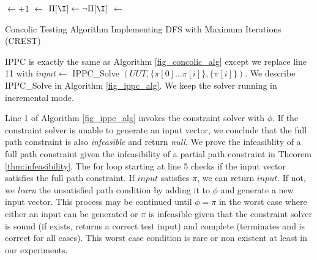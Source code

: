 \documentclass[EPiCempty]{easychair}
\begin{document}
\begin{algorithm}[!t]
\BlankLine
	\If{\NITR $<$ \MaxItr}
		{\label{Line4}
			\If{\TestInput $\neq$ \Null}
				{
					\NITR$\leftarrow$\NITR$+1$\;
					\Pi$\leftarrow$\Execute{\UUT, \TestInput}\;
					\Add{\Out, \TestInput}\;
				}
			\For{\I$\leftarrow $\SizeOf{\Pi}$-1$ \KwTo $0$}
				{
					\If{$!$\IsNegatedBefore{$\Pi[\I]$}}
						{
							\SetNegatedBefore{$\Pi[\I]$}\;
							$\Pi[\I] \leftarrow \neg \Pi[\I]$\;
							\TestInput$\leftarrow$ \CS{$\lbrace \Pi[0]...\Pi[i] \rbrace$}\;
							\KwReturn \DFS{\UUT, \MaxItr, \TestInput, \Out, \NITR}\;
						}
				}
		}
\KwReturn \Out\;

\caption{Concolic Testing Algorithm Implementing DFS with Maximum Iterations (CREST)} \label{fig_concolic_alg}
\end{algorithm}

IPPC is exactly the same as Algorithm \ref{fig_concolic_alg} except we replace line 11 with 
$input \leftarrow $ IPPC\_Solve $(UUT, \lbrace\pi[0]...\pi[i]\rbrace, \lbrace\pi[i]\rbrace)$. We describe IPPC\_Solve in Algorithm \ref{fig_ippc_alg}. We keep the solver running in incremental mode.

Line 1 of Algorithm \ref{fig_ippc_alg} invokes the constraint solver with $\phi$. If the constraint solver is unable to generate an input vector, we conclude that the full path constraint is also \emph{infeasible} and return \emph{null}. We prove the infeasiblity of a full path constraint given the infeasibility of a partial path constraint in Theorem \ref{thm:infeasibility}. The for loop starting at line 5 checks if the input vector satisfies the full path constraint. If $input$ satisfies $\pi$, we can return $input$. If not, we \emph{learn} the unsatisfied path condition by adding it to $\phi$ and generate a new input vector. This process may be continued until $\phi = \pi$ in the worst case where either an input can be generated or $\pi$ is infeasible given that the constraint solver is sound (if exists, returns a correct test input) and complete (terminates and is correct for all cases). This worst case condition is rare or non existent at least in our experiments.
\end{document}
